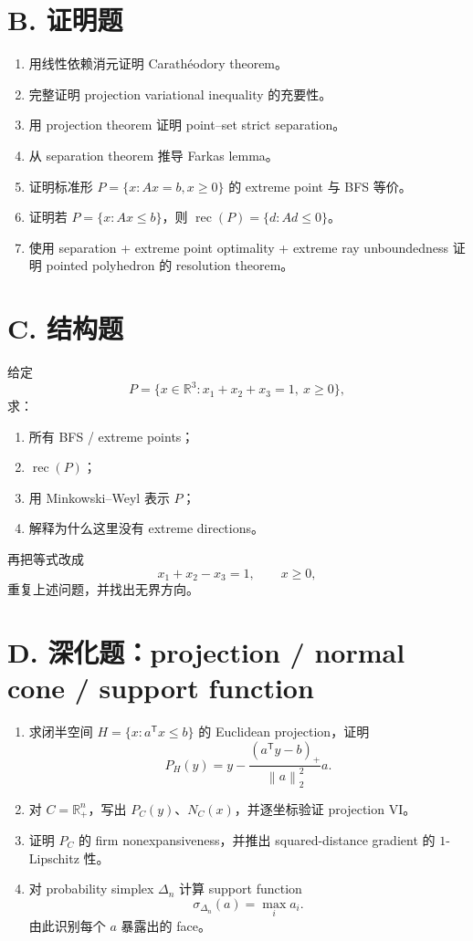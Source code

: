 \documentclass[11pt,a4paper,openany]{ctexrep}
\theoremstyle{definition}
\newcommand{\R}{\mathbb{R}}
\newcommand{\rec}{\operatorname{rec}}
\newcommand{\norm}[1]{\left\lVert #1\right\rVert}
\newcommand{\transpose}{\mathsf{T}}
\begin{document}
\section*{B. 证明题}
\begin{enumerate}[leftmargin=2.3em]
  \item 用线性依赖消元证明 Carath\'eodory theorem。
  \item 完整证明 projection variational inequality 的充要性。
  \item 用 projection theorem 证明 point--set strict separation。
  \item 从 separation theorem 推导 Farkas lemma。
  \item 证明标准形 $P=\{x:Ax=b,x\ge0\}$ 的 extreme point 与 BFS 等价。
  \item 证明若 $P=\{x:Ax\le b\}$，则 $\rec(P)=\{d:Ad\le0\}$。
  \item 使用 separation + extreme point optimality + extreme ray unboundedness 证明 pointed polyhedron 的 resolution theorem。
\end{enumerate}

\section*{C. 结构题}
给定
\[
P=\{x\in\R^3: x_1+x_2+x_3=1,\ x\ge0\},
\]
求：
\begin{enumerate}[leftmargin=2em]
  \item 所有 BFS / extreme points；
  \item $\rec(P)$；
  \item 用 Minkowski--Weyl 表示 $P$；
  \item 解释为什么这里没有 extreme directions。
\end{enumerate}

再把等式改成
\[
x_1+x_2-x_3=1,\qquad x\ge0,
\]
重复上述问题，并找出无界方向。

\section*{D. 深化题：projection / normal cone / support function}
\begin{enumerate}[leftmargin=2.3em]
  \item 求闭半空间 $H=\{x:a^\transpose x\le b\}$ 的 Euclidean projection，证明
  \[
  P_H(y)=y-\frac{(a^\transpose y-b)_+}{\norm{a}_2^2}a.
  \]
  \item 对 $C=\R_+^n$，写出 $P_C(y)$、$N_C(x)$，并逐坐标验证 projection VI。
  \item 证明 $P_C$ 的 firm nonexpansiveness，并推出 squared-distance gradient 的 $1$-Lipschitz 性。
  \item 对 probability simplex $\Delta_n$ 计算 support function
  \[
  \sigma_{\Delta_n}(a)=\max_i a_i.
  \]
  由此识别每个 $a$ 暴露出的 face。
\end{enumerate}
\end{document}
